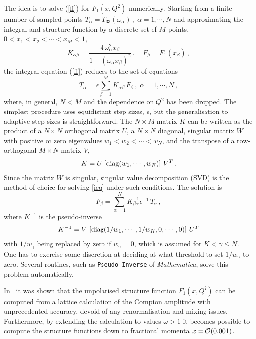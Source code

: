 The idea is to solve (\ref{ff}) for $F_1(x,Q^2)$ numerically. Starting from a finite number of sampled points $T_\alpha=T_{33}(\omega_\alpha) \,,\; \alpha=1, \cdots, N$ and approximating the integral and structure function by a discrete set of $M$ points, $0 < x_1 < x_2 < \cdots < x_M < 1$, 
\begin{equation}
K_{\alpha\beta} = \frac{4\,\omega_\alpha^2x_\beta}{1-(\omega_\alpha x_\beta)^2} \,, \quad F_\beta = F_1(x_\beta)\,,
\end{equation}
the integral equation (\ref{ff}) reduces to the set of equations 
\begin{equation}
T_\alpha = \epsilon \sum_{\beta=1}^M K_{\alpha\beta}\, F_\beta \,,\; \alpha=1, \cdots, N \,,
\label{ieq}
\end{equation}
where, in general, $N < M$ and the dependence on $Q^2$ has been dropped. The simplest procedure uses equidistant step sizes, $\epsilon$, but the generalisation to adaptive step sizes is straightforward. The $N \times M$ matrix $K$ can be written as the product of a $N \times N$ orthogonal matrix $U$, a $N \times N$ diagonal, singular matrix $W$ with positive or zero eigenvalues $w_1 < w_2 < \cdots < w_N$, and the transpose of a row-orthogonal $M \times N$ matrix $V$,
\begin{equation}
K = U \,\left[{\rm diag}(w_1, \cdots, w_N)\right]\,V^T \,.
\end{equation}
Since the matrix $W$ is singular, singular value decomposition (SVD) is the method of choice for solving \eqref{ieq} under such conditions. The solution is
\begin{equation}
F_\beta = \sum_{\alpha=1}^N K^{-1}_{\beta\alpha}\epsilon^{-1}\, T_\alpha \,, 
\label{svd}
\end{equation}
where $K^{-1}$ is the pseudo-inverse
\begin{equation}
K^{-1} = V \,\left[{\rm diag}(1/w_1, \cdots, 1/w_K, 0, \cdots, 0)\right]\, U^T 
\end{equation}
with $1/w_\gamma$ being replaced by zero if $w_\gamma=0$, which is assumed for $K < \gamma\leq N$. One has to exercise some discretion at deciding at
what threshold to set $1/w_\gamma$ to zero. Several routines, such as {\tt Pseudo-Inverse} of {\it Mathematica}, solve this problem
automatically. 

In~\cite{Chambers:2017dov} it was shown that the unpolarised structure function $F_1(x,Q^2)$ can be computed from a lattice calculation of the Compton amplitude with unprecedented accuracy, devoid of any renormalisation and mixing issues. Furthermore, by extending the calculation to values $\omega > 1$ it becomes possible
to compute the structure functions down to fractional momenta $x = {\cal O}(0.001)$.

